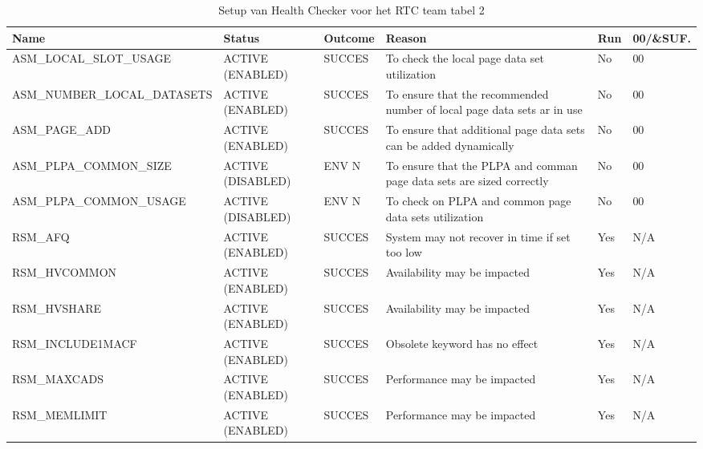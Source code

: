 \begin{landscape}
	\begin{table}[h]
		\begin{tabular}{|l|p{2.3cm}|l|p{4.5cm}|l|l|}
			\hline
			\textbf{Name}                       & \textbf{Status}   & \textbf{Outcome} & \textbf{Reason}    & \textbf{Run} &	\textbf{00/\&SUF.} \\ \hline
			ASM\_LOCAL\_SLOT\_USAGE      & ACTIVE (ENABLED)  & SUCCES & To   check the local page data set utilization                            & No  & 00  \\ \hline
			ASM\_NUMBER\_LOCAL\_DATASETS & ACTIVE (ENABLED)  & SUCCES & To   ensure that the recommended number of local page data sets ar in use & No  & 00  \\ \hline
			ASM\_PAGE\_ADD               & ACTIVE (ENABLED)  & SUCCES & To   ensure that additional page data sets can be added dynamically       & No  & 00  \\ \hline
			ASM\_PLPA\_COMMON\_SIZE      & ACTIVE (DISABLED) & ENV N  & To   ensure that the PLPA and comman page data sets are sized correctly   & No  & 00  \\ \hline
			ASM\_PLPA\_COMMON\_USAGE     & ACTIVE (DISABLED) & ENV N  & To   check on PLPA and common page data sets utilization                  & No  & 00  \\ \hline
			RSM\_AFQ                     & ACTIVE (ENABLED)  & SUCCES & System   may not recover in time if set too low                           & Yes & N/A \\ \hline
			RSM\_HVCOMMON                & ACTIVE (ENABLED)  & SUCCES & Availability   may be impacted                                            & Yes & N/A \\ \hline
			RSM\_HVSHARE                 & ACTIVE (ENABLED)  & SUCCES & Availability   may be impacted                                            & Yes & N/A \\ \hline
			RSM\_INCLUDE1MACF            & ACTIVE (ENABLED)  & SUCCES & Obsolete   keyword has no effect                                          & Yes & N/A \\ \hline
			RSM\_MAXCADS                 & ACTIVE (ENABLED)  & SUCCES & Performance   may be impacted                                             & Yes & N/A \\ \hline
			RSM\_MEMLIMIT                & ACTIVE (ENABLED)  & SUCCES & Performance   may be impacted                                             & Yes & N/A \\ \hline			
		\end{tabular}
		\caption[Health Checker RTC team tabel 2]{Setup van Health Checker voor het RTC team tabel 2}
		\label{tbl:RTC Team Tabel 2}
	\end{table}
\end{landscape}

